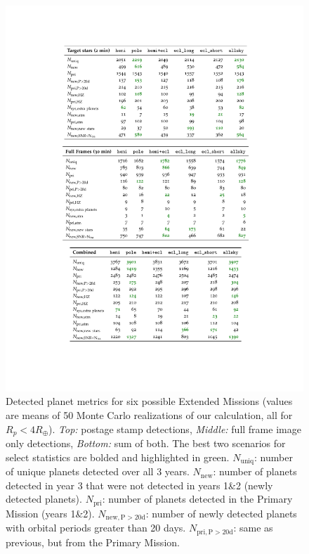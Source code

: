 \begin{figure}[!t]
	\centering
	\includegraphics[scale=2.]{tables/cropped_tables_vis_nogap.pdf}
	\caption{Detected planet metrics for six possible Extended Missions (values are means of 50 Monte Carlo realizations of our calculation, all for $R_p<4R_\oplus$).
	\textit{Top:} postage stamp detections, \textit{Middle:} full frame image only detections, \textit{Bottom:} sum of both.
	The best two scenarios for select statistics are bolded and highlighted in 
	green.
	\newline
	$N_\mathrm{uniq}$: number of unique planets detected over all 3 years.
	$N_\mathrm{new}$: number of planets detected in year 3 that were not detected in years 1\&2 (newly detected planets).
	$N_\mathrm{pri}$: number of planets detected in the Primary Mission (years 1\&2).
	$N_\mathrm{new,P>20d}$: number of newly detected planets with orbital periods greater than 20 days.
	$N_\mathrm{pri,P>20d}$: same as previous, but from the Primary Mission.
}
\end{figure}
